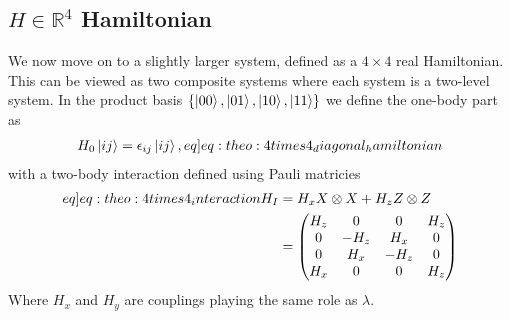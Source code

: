 \subsection{$H \in \mathbb{R}^4$ Hamiltonian}
We now move on to a slightly larger system, defined as a $4 \times 4$ real Hamiltonian. This can be viewed as two  composite systems where each system is a two-level system. In the product basis $\{\ket{00},\ket{01},\ket{10},\ket{11}\}$ we define the one-body part as 
\begin{align}
    H_0 \ket{ij} = \epsilon_{ij}\ket{ij}, \label[eq]{eq:theo:4times4_diagonal_hamiltonian}
\end{align}
with a two-body interaction defined using Pauli matricies
\begin{align}
    \begin{split} \label[eq]{eq:theo:4times4_interaction}
        H_I &= H_x X \otimes X + H_z Z \otimes Z \\
        &= \begin{pmatrix}
            H_z & 0 & 0 & H_z \\
            0 & - H_z & H_x & 0 \\
            0 & H_x & - H_z & 0 \\
            H_x & 0 & 0 & H_z
        \end{pmatrix}
    \end{split}
\end{align}
Where $H_x$ and $H_y$ are couplings playing the same role as $\lambda$.


